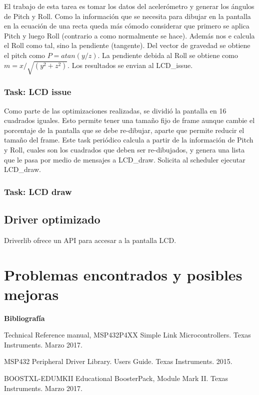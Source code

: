 El trabajo de esta tarea es tomar los datos del acelerómetro y generar los ángulos de Pitch y
Roll. Como la información que se necesita para dibujar en la pantalla en la ecuación de una recta
queda más cómodo considerar que primero se aplica Pitch y luego Roll (contrario a como normalmente se
hace). Además nos e calcula el Roll como tal, sino la pendiente (tangente). Del vector de gravedad
se obtiene el pitch como $P = atan(y/z)$. La pendiente debida al Roll se obtiene como $m =
x/\sqrt{(y^2+z^2)}$. Los resultados se envian al LCD\_issue. 

\subsubsection{Task: LCD issue}
\label{sec:lcd_issue}

Como parte de las optimizaciones realizadas, se dividió la pantalla en 16 cuadrados iguales. Esto
permite tener una tamaño fijo de frame aunque cambie el porcentaje de la pantalla que se debe
re-dibujar, aparte que permite reducir el tamaño del frame. Este task periódico calcula a partir de la
información de Pitch y Roll, cuales son los cuadrados que deben ser re-dibujados, y genera una lista
que le pasa por medio de mensajes a LCD\_draw. Solicita al scheduler ejecutar LCD\_draw. 
\subsubsection{Task: LCD draw}
\label{sec:lcd_draw}


\subsection{Driver optimizado}
Driverlib ofrece un API para accesar a la pantalla LCD. 

\section{Problemas encontrados y posibles mejoras}


\textbf{ Bibliografía}

Technical Reference manual, MSP432P4XX Simple Link Microcontrollers. Texas Instruments. Marzo 2017.

MSP432 Peripheral Driver Library. Users Guide. Texas Instruments. 2015.

BOOSTXL-EDUMKII Educational BoosterPack, Module Mark II. Texas Instruments. Marzo 2017.


%
%
